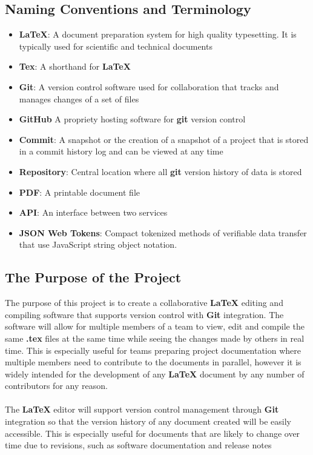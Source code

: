 \documentclass[12pt, titlepage]{article}
\begin{document}
	\subsection{Naming Conventions and Terminology}
	
	\begin{itemize}
		\item \textbf{LaTeX}: A document preparation system for high quality typesetting. It is typically used for scientific and technical documents
		\item \textbf{Tex}: A shorthand for \textbf{LaTeX}
		\item \textbf{Git}: A version control software used for collaboration that tracks and manages changes of a set of files
		\item \textbf{GitHub} A propriety hosting software for \textbf{git} version control
		\item \textbf{Commit}: A snapshot or the creation of a snapshot of a project that is stored in a commit history log and can be viewed at any time
		\item \textbf{Repository}: Central location where all \textbf{git} version history of data is stored
		\item \textbf{PDF}: A printable document file
		\item \textbf{API}: An interface between two services
		\item \textbf{JSON Web Tokens}: Compact tokenized methods of verifiable data transfer that use JavaScript string object notation.
	\end{itemize}
	
	\subsection{The Purpose of the Project}
	
	The purpose of this project is to create a collaborative \textbf{LaTeX} editing and compiling software that supports version control with\textbf{ Git }integration. The software will allow for multiple members of a team to view, edit and compile the same \textbf{.tex} files at the same time while seeing the changes made by others in real time. This is especially useful for teams preparing project documentation where multiple members need to contribute to the documents in parallel, however it is widely intended for the development of any \textbf{LaTeX} document by any number of contributors for any reason.\\
	\\The \textbf{LaTeX} editor will support version control management through\textbf{ Git }integration so that the version history of any document created will be easily accessible. This is especially useful for documents that are likely to change over time due to revisions, such as software documentation and release notes
	
\end{document}
